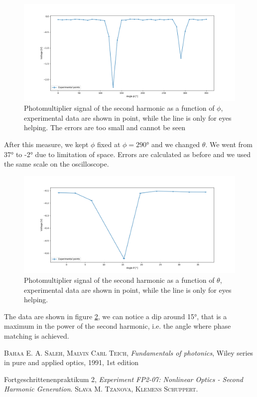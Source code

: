 \documentclass[a4paper,10pt]{article}
\begin{document}
\begin{figure}[H]
\centering
\includegraphics[width = \textwidth]{spectrum}
\caption{Photomultiplier signal of the second harmonic as a function of $\phi$, experimental data are shown in point, while the line is only for eyes helping. The errors are too small and cannot be seen}
\label{spectrum}
\end{figure}
After this measure, we kept $\phi$ fixed at $\phi=290$° and we changed $\theta$. We went from 37° to -2° due to limitation of space. Errors are calculated as before and we used the same scale on the oscilloscope.
\begin{figure}[H]
\centering
\includegraphics[width = \textwidth]{spectrum2}
\caption{Photomultiplier signal of the second harmonic as a function of $\theta$, experimental data are shown in point, while the line is only for eyes helping.}
\label{spectrum2}
\end{figure}
The data are shown in figure \ref{spectrum2}, we can notice a dip around 15°, that is a maximum in the power of the second harmonic, i.e. the angle where phase matching is achieved.

\begin{thebibliography}{99}
  \textsc{Bahaa E. A. Saleh, Malvin Carl Teich}, \textit{Fundamentals of photonics}, Wiley series in pure and applied optics, 1991, 1st edition

Fortgeschrittenenpraktikum 2, \textit{Experiment FP2-07: Nonlinear Optics - Second Harmonic Generation}. \textsc{Slava M. Tzanova, Klemens Schuppert}.
\end{thebibliography}
\end{document}
